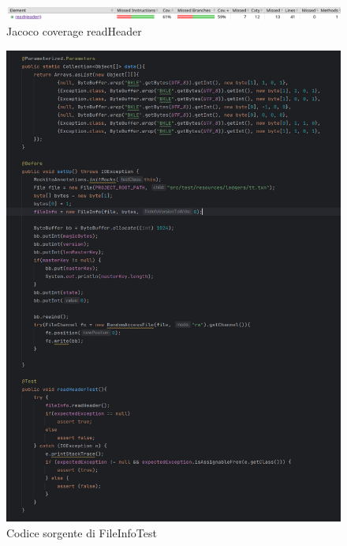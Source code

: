 \documentclass[12pt, a4paper]{article}
\begin{document}
  \begin{figure}
    \includegraphics[width=\linewidth]{./images/file_info/JacocoCoveragereadHeader1.png}
    \caption{Jacoco coverage readHeader}
    \label{fig:JacocoCoveragereadHeader1}
  \end{figure}
  \begin{figure}
    \includegraphics[width=\linewidth]{./images/file_info/Code1ReadHeader.png}
    \caption{Codice sorgente di FileInfoTest}
    \label{fig:Code1ReadHeader}
  \end{figure}
\end{document}
